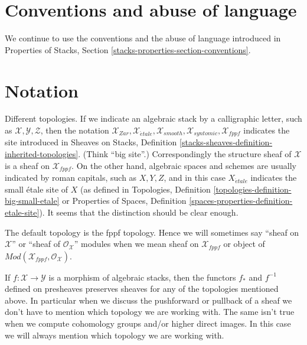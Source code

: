 \section{Conventions and abuse of language}
\label{section-conventions}

\noindent
We continue to use the conventions and the abuse of language
introduced in
Properties of Stacks, Section \ref{stacks-properties-section-conventions}.








\section{Notation}
\label{section-notation}

\noindent
Different topologies. If we indicate an algebraic stack by a calligraphic
letter, such as $\mathcal{X}, \mathcal{Y}, \mathcal{Z}$, then the notation
$\mathcal{X}_{Zar}, \mathcal{X}_{\acute{e}tale}, \mathcal{X}_{smooth},
\mathcal{X}_{syntomic}, \mathcal{X}_{fppf}$ indicates the site introduced
in
Sheaves on Stacks, Definition
\ref{stacks-sheaves-definition-inherited-topologies}.
(Think ``big site''.) Correspondingly the structure sheaf of
$\mathcal{X}$ is a sheaf on $\mathcal{X}_{fppf}$.
On the other hand, algebraic spaces and schemes
are usually indicated by roman capitals, such as $X, Y, Z$, and in this case
$X_{\acute{e}tale}$ indicates the small \'etale site of $X$ (as
defined in
Topologies, Definition
\ref{topologies-definition-big-small-etale}
or
Properties of Spaces, Definition
\ref{spaces-properties-definition-etale-site}).
It seems that the distinction should be clear enough.

\medskip\noindent
The default topology is the fppf topology. Hence we will sometimes
say ``sheaf on $\mathcal{X}$'' or ``sheaf of $\mathcal{O}_\mathcal{X}$''
modules when we mean sheaf on $\mathcal{X}_{fppf}$ or object of
$\textit{Mod}(\mathcal{X}_{fppf}, \mathcal{O}_\mathcal{X})$.

\medskip\noindent
If $f : \mathcal{X} \to \mathcal{Y}$ is a morphism of algebraic
stacks, then the functors $f_*$ and $f^{-1}$ defined on presheaves
preserves sheaves for any of the topologies mentioned above. In particular
when we discuss the pushforward or pullback of a sheaf we don't have to
mention which topology we are working with. The same isn't true
when we compute cohomology groups and/or higher direct images. In this
case we will always mention which topology we are working with.

